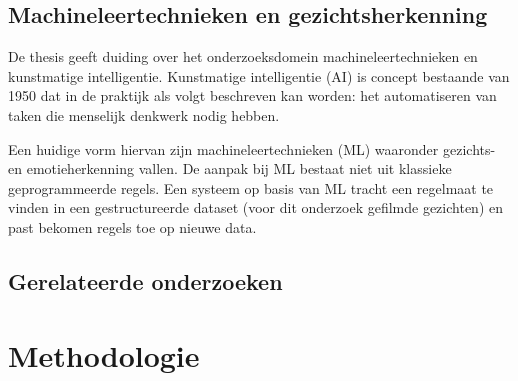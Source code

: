 %



\subsection{Machineleertechnieken en gezichtsherkenning}
De thesis \textcite{Jonsson2018} geeft duiding over het onderzoeksdomein machineleertechnieken en kunstmatige intelligentie. Kunstmatige intelligentie (AI) is concept bestaande van 1950 dat in de praktijk als volgt beschreven kan worden: het automatiseren van taken die menselijk denkwerk nodig hebben. 

Een huidige vorm hiervan zijn machineleertechnieken (ML) waaronder gezichts- en emotieherkenning vallen. De aanpak bij ML bestaat niet uit klassieke geprogrammeerde regels. Een systeem op basis van ML tracht een regelmaat te vinden in een gestructureerde dataset (voor dit onderzoek gefilmde gezichten) en past bekomen regels toe op nieuwe data. 

\subsection{Gerelateerde onderzoeken}

\section{Methodologie}
\label{sec:methodologie}


